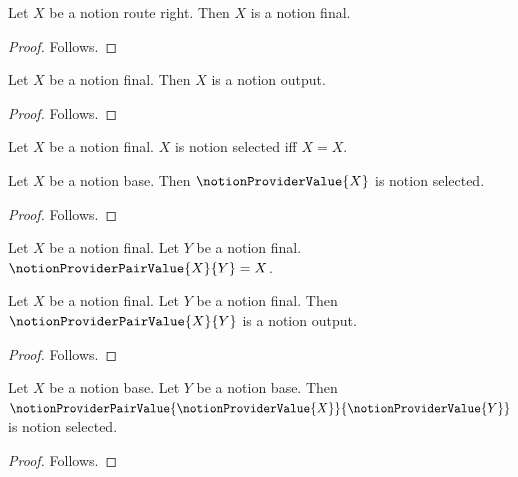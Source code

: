 \begin{classification}\label{notion_provider_route_right_is_final}
    Let $X$ be a notion route right.
    Then $X$ is a notion final.
\end{classification}
\begin{proof}
    Follows.
\end{proof}

\begin{classification}\label{notion_provider_final_is_output}
    Let $X$ be a notion final.
    Then $X$ is a notion output.
\end{classification}
\begin{proof}
    Follows.
\end{proof}

\begin{definition}\label{notion_provider_selected}
    Let $X$ be a notion final.
    $X$ is notion selected iff $X=X$.
\end{definition}

\begin{proposition}\label{notion_provider_rule_same_module}
    Let $X$ be a notion base.
    Then $\notionProviderValue{X}$ is notion selected.
\end{proposition}
\begin{proof}
    Follows.
\end{proof}

\begin{definition}\label{notion_provider_pair_value}
    Let $X$ be a notion final.
    Let $Y$ be a notion final.
    $\notionProviderPairValue{X}{Y}=X$.
\end{definition}

\begin{classification}\label{notion_provider_pair_value_result}
    Let $X$ be a notion final.
    Let $Y$ be a notion final.
    Then $\notionProviderPairValue{X}{Y}$ is a notion output.
\end{classification}
\begin{proof}
    Follows.
\end{proof}

\begin{proposition}\label{notion_provider_pair_composite_premises}
    Let $X$ be a notion base.
    Let $Y$ be a notion base.
    Then $\notionProviderPairValue
        {\notionProviderValue{X}}
        {\notionProviderValue{Y}}$ is notion selected.
\end{proposition}
\begin{proof}
    Follows.
\end{proof}

